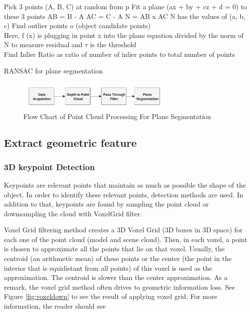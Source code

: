\begin{algorithm}[H]
\SetAlgoLined
{}
 {
 Pick 3 points (A, B, C) at random from p \;
 Fit a plane (ax + by + cz + d = 0) to these 3 points\;
    AB = B - A\;
    AC = C - A\;
    N = AB x AC\;
    N has the values of (a, b, c)\;
    Find outlier points o (object candidate points)\\
    Here, f (x) is plugging in point x into the plane equation divided by the norm of N to measure residual and $\tau$ is the threshold\\
    Find Inlier Ratio as ratio of number of inlier points to total number of points
}
\caption{RANSAC for plane segmentation
\label{alg:algPlane}
\cite{cadPipeline3}}
\end{algorithm}

\begin{figure}[!h]
\begin{center}
\includegraphics[width=3in]{diagrams/planesegmentation.png}
\caption{Flow Chart of Point Cloud Processing For Plane Segmentation}
\label{fig:planesegmentation}
\end{center}
\end{figure}

\subsection{Extract geometric feature}
\subsubsection{3D keypoint Detection}

Keypoints are relevant points that maintain as much as possible the shape of the object. In order to identify these relevant points, detection methods are used. In addition to that, keypoints are found by sampling the point cloud or downsampling the cloud with  VoxelGrid filter.

Voxel Grid filtering method \cite{algFiltering} creates a 3D Voxel Grid
(3D boxes in 3D space) for each one of the point cloud (model and scene cloud). Then, in each voxel, a point is chosen to approximate all the points that lie on that voxel. Usually, the centroid (an arithmetic mean) of these points or the center (the point in the interior that is equidistant from all points) of this voxel is used as the approximation. The centroid is slower than the center approximation. As a remark, the voxel grid method often drives to geometric information loss. See Figure \ref{fig:voxeldown} to see the result of applying voxel grid. For more information, the reader should see \cite{algDownsampling}

